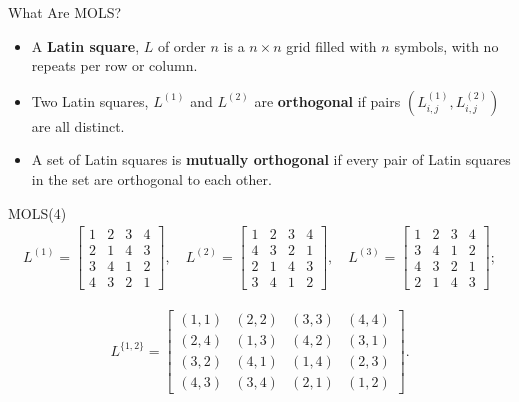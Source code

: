 \documentclass{beamer}
\begin{document}
\begin{frame}{What Are MOLS?}
  \begin{itemize}
    \item A \textbf{Latin square}, $L$ of order \(n\) is a \(n \times n\) grid filled with \(n\) symbols, with no repeats per row or column.
    \item Two Latin squares, $L^{(1)}$ and $L^{(2)}$ are \textbf{orthogonal} if pairs \((L^{(1)}_{i,j}, L^{(2)}_{i,j})\) are all distinct.
    \item A set of Latin squares is \textbf{mutually orthogonal} if every pair of Latin squares in the set are orthogonal to each other.
  \end{itemize}
\end{frame}


\begin{frame}{MOLS(4)}
\[
\begin{aligned}
    L^{(1)} = \begin{bmatrix}
        1 & 2 & 3 & 4\\
        2 & 1 & 4 & 3\\
        3 & 4 & 1 & 2\\
        4 & 3 & 2 & 1
    \end{bmatrix},\quad 
    L^{(2)} = \begin{bmatrix}
        1 & 2 & 3 & 4\\
        4 & 3 & 2 & 1\\
        2 & 1 & 4 & 3\\
        3 & 4 & 1 & 2
    \end{bmatrix},\quad
    L^{(3)} = \begin{bmatrix}
        1&2&3&4\\
        3&4&1&2\\
        4&3&2&1\\
        2&1&4&3
    \end{bmatrix};
\end{aligned}
\]

\[
\begin{aligned}
    L^{\{1,2\}} =
    \begin{bmatrix}
        (1,1) & (2,2) & (3,3) & (4,4)\\
        (2,4) & (1,3) & (4,2) & (3,1)\\
        (3,2) & (4,1) & (1,4) & (2,3)\\
        (4,3) & (3,4) & (2,1) & (1,2)
    \end{bmatrix}.
\end{aligned}
\]
\end{frame}
\end{document}
